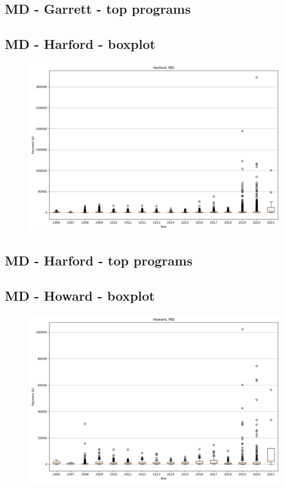 \subsection*{MD - Garrett - top programs}

\newpage
\subsection*{MD - Harford - boxplot}
\begin{figure}[h]
\centering
\includegraphics[width=7in]{../output/boxplots/counties/Harford-MD_boxplot.png}
\end{figure}


\subsection*{MD - Harford - top programs}

\newpage
\subsection*{MD - Howard - boxplot}
\begin{figure}[h]
\centering
\includegraphics[width=7in]{../output/boxplots/counties/Howard-MD_boxplot.png}
\end{figure}


